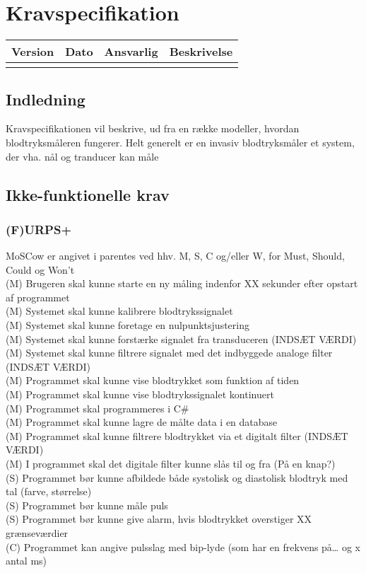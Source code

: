 \chapter{Kravspecifikation}

\begin{longtabu} to 
    Version &    Dato &    Ansvarlig &    Beskrivelse\\[-1ex]
    \midrule
\label{version_Systemark}
\end{longtabu}


\section{Indledning}
Kravspecifikationen vil beskrive, ud fra en række modeller, hvordan blodtryksmåleren fungerer. Helt generelt er en invasiv blodtryksmåler et system, der vha. nål og tranducer kan måle 

\section{Ikke-funktionelle krav}
\subsection{(F)URPS+}
MoSCow er angivet i parentes ved hhv. M, S, C og/eller W, for Must, Should, Could og Won't\\
(M) Brugeren skal kunne starte en ny måling indenfor XX sekunder efter opstart af programmet \\
(M) Systemet skal kunne kalibrere blodtrykssignalet\\
(M) Systemet skal kunne foretage en nulpunktsjustering\\
(M) Systemet skal kunne forstærke signalet fra transduceren (INDSÆT VÆRDI)\\
(M) Systemet skal kunne filtrere signalet med det indbyggede analoge filter (INDSÆT VÆRDI)\\
(M) Programmet skal kunne vise blodtrykket som funktion af tiden\\
(M) Programmet skal kunne vise blodtrykssignalet kontinuert\\
(M) Programmet skal programmeres i C\#\\
(M) Programmet skal kunne lagre de målte data i en database\\
(M) Programmet skal kunne filtrere blodtrykket via et digitalt filter (INDSÆT VÆRDI)\\
(M) I programmet skal det digitale filter kunne slås til og fra (På en knap?)\\
(S) Programmet bør kunne afbildede både systolisk og diastolisk blodtryk med tal (farve, størrelse)\\
(S) Programmet bør kunne måle puls\\
(S) Programmet bør kunne give alarm, hvis blodtrykket overstiger XX grænseværdier\\
(C) Programmet kan angive pulsslag med bip-lyde (som har en frekvens på… og x antal ms)\\


